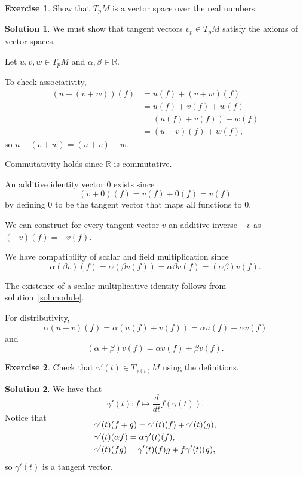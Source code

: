 \documentclass[11pt, a4paper]{article}
\theoremstyle{definition}
\newtheorem{ex}{Exercise}[part]
\newtheorem{sol}{Solution}[part]
\begin{document}
\begin{ex}

Show that $T_p M$ is a vector space over the real numbers.

\end{ex}

\begin{sol}

We must show that tangent vectors $v_p \in T_p M$ satisfy the axioms of vector spaces.

Let $u, v, w \in T_p M$ and $\alpha, \beta \in \mathbb{R}$.

To check associativity,
\begin{align*}
    (u + (v + w))(f) &= u(f) + (v + w)(f) \\
                     &= u(f) + v(f) + w(f) \\
                     &= (u(f) + v(f)) + w(f) \\
                     &= (u + v)(f) + w(f),
\end{align*}
so $u + (v + w) = (u + v) + w$.

Commutativity holds since $\mathbb{R}$ is commutative.

An additive identity vector $0$ exists since
\[
    (v + 0)(f) = v(f) + 0(f) = v(f)
\]
by defining $0$ to be the tangent vector that maps all functions to $0$.

We can construct for every tangent vector $v$ an additive inverse $-v$ as $(-v)(f) = -v(f)$.

We have compatibility of scalar and field multiplication since
\[
    \alpha(\beta v)(f) = \alpha (\beta v(f))
        = \alpha \beta v(f) = (\alpha \beta) v(f).
\]

The existence of a scalar multiplicative identity follows from solution~\ref{sol:module}.

For distributivity,
\[
    \alpha(u + v)(f) = \alpha (u(f) + v(f)) = \alpha u(f) + \alpha v(f)
\]
and
\[
    (\alpha + \beta) v(f) = \alpha v(f) + \beta v(f).
\]

\end{sol}

\begin{ex}

Check that $\gamma'(t) \in T_{\gamma(t)}M$ using the definitions.

\end{ex}

\begin{sol}

We have that
\[
    \gamma'(t): f \mapsto \frac{d}{dt} f\left( \gamma(t) \right).
\]
Notice that
\begin{align*}
    \SwapAboveDisplaySkip
    &\gamma'(t)(f + g) = \gamma'(t)(f) + \gamma'(t)(g), \\
    &\gamma'(t)(\alpha f) = \alpha \gamma'(t)(f), \\
    &\gamma'(t)(f g) = \gamma'(t)(f) g + f \gamma'(t)(g),
\end{align*}
so $\gamma'(t)$ is a tangent vector.

\end{sol}
\end{document}
